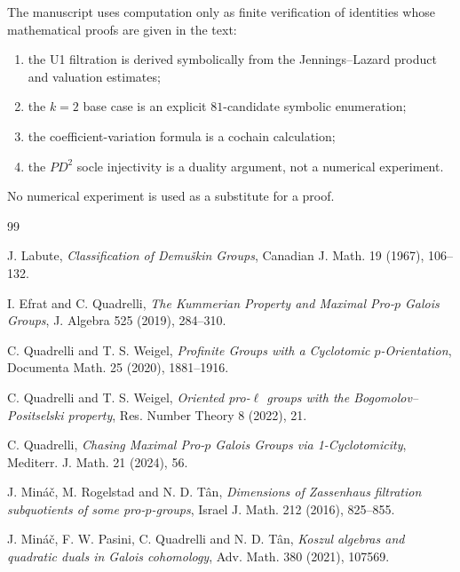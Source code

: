 \documentclass[11pt]{article}
\begin{document}
The manuscript uses computation only as finite verification of identities
whose mathematical proofs are given in the text:
\begin{enumerate}[label=(\roman*)]
\item the U1 filtration is derived symbolically from the
Jennings--Lazard product and valuation estimates;
\item the $k=2$ base case is an explicit $81$-candidate symbolic
enumeration;
\item the coefficient-variation formula is a cochain calculation;
\item the $PD^2$ socle injectivity is a duality argument, not a numerical
experiment.
\end{enumerate}
No numerical experiment is used as a substitute for a proof.

\begin{thebibliography}{99}

J. Labute, \emph{Classification of Demu\v{s}kin Groups},
Canadian J. Math. 19 (1967), 106--132.

I. Efrat and C. Quadrelli,
\emph{The Kummerian Property and Maximal Pro-$p$ Galois Groups},
J. Algebra 525 (2019), 284--310.

C. Quadrelli and T. S. Weigel,
\emph{Profinite Groups with a Cyclotomic $p$-Orientation},
Documenta Math. 25 (2020), 1881--1916.

C. Quadrelli and T. S. Weigel,
\emph{Oriented pro-$\ell$ groups with the Bogomolov--Positselski property},
Res. Number Theory 8 (2022), 21.

C. Quadrelli,
\emph{Chasing Maximal Pro-$p$ Galois Groups via 1-Cyclotomicity},
Mediterr. J. Math. 21 (2024), 56.

J. Mináč, M. Rogelstad and N. D. Tân,
\emph{Dimensions of Zassenhaus filtration subquotients of some pro-$p$-groups},
Israel J. Math. 212 (2016), 825--855.

J. Mináč, F. W. Pasini, C. Quadrelli and N. D. Tân,
\emph{Koszul algebras and quadratic duals in Galois cohomology},
Adv. Math. 380 (2021), 107569.

\end{thebibliography}
\end{document}
